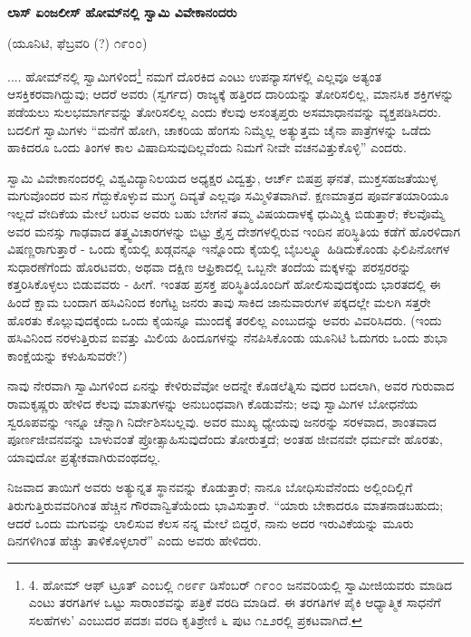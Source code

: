 \begin{center}
\textbf{ಲಾಸ್ ಏಂಜಲೀಸ್ ಹೋಮ್​ನಲ್ಲಿ ಸ್ವಾಮಿ ವಿವೇಕಾನಂದರು}
\end{center}

\begin{center}
(ಯೂನಿಟಿ, ಫೆಬ್ರವರಿ (?) ೧೯೦೦)
\end{center}

.... ಹೋಮ್​ನಲ್ಲಿ ಸ್ವಾಮಿಗಳಿಂದ\footnote{4. ಹೋಮ್​ ಆಫ್ ಟ್ರೂತ್ ಎಂಬಲ್ಲಿ ೧೮೯೯ ಡಿಸೆಂಬರ್ ೧೯೦೦ ಜನವರಿಯಲ್ಲಿ ಸ್ವಾಮೀಜಿಯವರು ಮಾಡಿದ ಎಂಟು ತರಗತಿಗಳ ಒಟ್ಟು ಸಾರಾಂಶವನ್ನು ಪತ್ರಿಕೆ ವರದಿ ಮಾಡಿದೆ. ಈ ತರಗತಿಗಳ ಪೈಕಿ ಆಧ್ಯಾತ್ಮಿಕ ಸಾಧನೆಗೆ ಸಲಹೆಗಳು’ ಎಂಬುದರ ಪದಶಃ ವರದಿ ಕೃತಿಶ್ರೇಣಿ ೬ ಪುಟ ೧೭೨ರಲ್ಲಿ ಪ್ರಕಟವಾಗಿದೆ.} ನಮಗೆ ದೊರಕಿದ ಎಂಟು ಉಪನ್ಯಾಸಗಳಲ್ಲಿ ಎಲ್ಲವೂ ಅತ್ಯಂತ ಆಸಕ್ತಿಕರವಾಗಿದ್ದುವು; ಆದರೆ ಅವರು (ಸ್ವರ್ಗದ) ರಾಜ್ಯಕ್ಕೆ ಹತ್ತಿರದ ದಾರಿಯನ್ನು ತೋರಿಸಲಿಲ್ಲ, ಮಾನಸಿಕ ಶಕ್ತಿಗಳನ್ನು ಪಡೆಯಲು ಸುಲಭಮಾರ್ಗವನ್ನು ತೋರಿಸಲಿಲ್ಲ ಎಂದು ಕೆಲವು ಅಸಂತೃಪ್ತರು ಅಸಮಾಧಾನವನ್ನು ವ್ಯಕ್ತಪಡಿಸಿದರು. ಬದಲಿಗೆ ಸ್ವಾಮಿಗಳು “ಮನೆಗೆ ಹೋಗಿ, ಚಾಕರಿಯ ಹೆಂಗಸು ನಿಮ್ಮೆಲ್ಲ ಅತ್ಯುತ್ತಮ ಚೈನಾ ಪಾತ್ರೆಗಳನ್ನು ಒಡೆದು ಹಾಕಿದರೂ ಒಂದು ತಿಂಗಳ ಕಾಲ ವಿಷಾದಿಸುವುದಿಲ್ಲವೆಂದು ನಿಮಗೆ ನೀವೇ ವಚನವಿತ್ತುಕೊಳ್ಳಿ” ಎಂದರು.

ಸ್ವಾಮಿ ವಿವೇಕಾನಂದರಲ್ಲಿ ವಿಶ್ವವಿದ್ಯಾನಿಲಯದ ಅಧ್ಯಕ್ಷರ ವಿದ್ವತ್ತು, ಆರ್ಚ್ ಬಿಷಪ್ರ ಘನತೆ, ಮುಕ್ತಸಹಜತೆಯುಳ್ಳ ಮಗುವೊಂದರ ಮನ ಗೆದ್ದುಕೊಳ್ಳುವ ಮುಗ್ಧ ದಿವ್ಯತೆ ಎಲ್ಲವೂ ಸಮ್ಮಿಳಿತವಾಗಿವೆ. ಕ್ಷಣಮಾತ್ರದ ಪೂರ್ವತಯಾರಿಯೂ ಇಲ್ಲದೆ ವೇದಿಕೆಯ ಮೇಲೆ ಬರುವ ಅವರು ಬಹು ಬೇಗನೆ ತಮ್ಮ ವಿಷಯದಾಳಕ್ಕೆ ಧುಮ್ಮಿಕ್ಕಿ ಬಿಡುತ್ತಾರೆ; ಕೆಲವೊಮ್ಮೆ ಅವರ ಮನಸ್ಸು ಗಾಢವಾದ ತತ್ತ್ವವಿಚಾರಗಳನ್ನು ಬಿಟ್ಟು ಕ್ರೈಸ್ತ ದೇಶಗಳಲ್ಲಿರುವ ಇಂದಿನ ಪರಿಸ್ಥಿತಿಯ ಕಡೆಗೆ ಹೊರಳಿದಾಗ ವಿಷಣ್ಣರಾಗುತ್ತಾರೆ - ಒಂದು ಕೈಯಲ್ಲಿ ಖಡ್ಗವನ್ನೂ ಇನ್ನೊಂದು ಕೈಯಲ್ಲಿ ಬೈಬಲ್ನ್ನೂ ಹಿಡಿದುಕೊಂಡು ಫಿಲಿಪಿನೋಗಳ ಸುಧಾರಣೆಗೆಂದು ಹೊರಟವರು, ಅಥವಾ ದಕ್ಷಿಣ ಆಫ್ರಿಕಾದಲ್ಲಿ ಒಬ್ಬನೇ ತಂದೆಯ ಮಕ್ಕಳನ್ನು ಪರಸ್ಪರರನ್ನು ಕತ್ತರಿಸಿಕೊಳ್ಳಲು ಬಿಡುವವರು - ಹೀಗೆ. ಇಂತಹ ಪ್ರಸಕ್ತ ಪರಿಸ್ಥಿತಿಯೊಂದಿಗೆ ಹೋಲಿಸುವುದಕ್ಕೆಂದು ಭಾರತದಲ್ಲಿ ಈ ಹಿಂದೆ ಕ್ಷಾಮ ಬಂದಾಗ ಹಸಿವಿನಿಂದ ಕಂಗೆಟ್ಟ ಜನರು ತಾವು ಸಾಕಿದ ಜಾನುವಾರುಗಳ ಪಕ್ಕದಲ್ಲೇ ಮಲಗಿ ಸತ್ತರೇ ಹೊರತು ಕೊಲ್ಲುವುದಕ್ಕೆಂದು ಒಂದು ಕೈಯನ್ನೂ ಮುಂದಕ್ಕೆ ತರಲಿಲ್ಲ ಎಂಬುದನ್ನು ಅವರು ವಿವರಿಸಿದರು. (ಇಂದು ಹಸಿವಿನಿಂದ ನರಳುತ್ತಿರುವ ಐವತ್ತು ಮಿಲಿಯ ಹಿಂದೂಗಳನ್ನು ನೆನಪಿಸಿಕೊಂಡು ಯೂನಿಟಿ ಓದುಗರು ಒಂದು ಶುಭಾ ಕಾಂಕ್ಷೆಯನ್ನು ಕಳುಹಿಸುವರೇ?)

ನಾವು ನೇರವಾಗಿ ಸ್ವಾಮಿಗಳಿಂದ ಏನನ್ನು ಕೇಳಿರುವೆವೋ ಅದನ್ನೇ ಕೊಡಲೆತ್ನಿಸು ವುದರ ಬದಲಾಗಿ, ಅವರ ಗುರುವಾದ ರಾಮಕೃಷ್ಣರು ಹೇಳಿದ ಕೆಲವು ಮಾತುಗಳನ್ನು ಅನುಬಂಧವಾಗಿ ಕೊಡುವೆನು; ಅವು ಸ್ವಾಮಿಗಳ ಬೋಧನೆಯ ಸ್ವರೂಪವನ್ನು ಇನ್ನೂ ಚೆನ್ನಾಗಿ ನಿರ್ದೇಶಿಸಬಲ್ಲವು. ಅವರ ಮುಖ್ಯ ಧ್ಯೇಯವು ಜನರನ್ನು ಸರಳವಾದ, ಶಾಂತವಾದ ಪೂರ್ಣಜೀವನವನ್ನು ಬಾಳುವಂತೆ ಪ್ರೋತ್ಸಾಹಿಸುವುದೆಂದು ತೋರುತ್ತದೆ; ಅಂತಹ ಜೀವನವೇ ಧರ್ಮವೇ ಹೊರತು, ಯಾವುದೋ ಪ್ರತ್ಯೇಕವಾಗಿರುವಂಥದಲ್ಲ.

ನಿಜವಾದ ತಾಯಿಗೆ ಅವರು ಅತ್ಯುನ್ನತ ಸ್ಥಾನವನ್ನು ಕೊಡುತ್ತಾರೆ; ನಾನೂ ಬೋಧಿಸುವೆನೆಂದು ಅಲ್ಲಿಂದಿಲ್ಲಿಗೆ ತಿರುಗುತ್ತಿರುವವರಿಗಿಂತ ಹೆಚ್ಚಿನ ಗೌರವಾನ್ವಿತೆಯೆಂದು ಭಾವಿಸುತ್ತಾರೆ. “ಯಾರು ಬೇಕಾದರೂ ಮಾತನಾಡಬಹುದು; ಆದರೆ ಒಂದು ಮಗುವನ್ನು ಲಾಲಿಸುವ ಕೆಲಸ ನನ್ನ ಮೇಲೆ ಬಿದ್ದರೆ, ನಾನು ಅದರ ಇರುವಿಕೆಯನ್ನು ಮೂರು ದಿನಗಳಿಗಿಂತ ಹೆಚ್ಚು ತಾಳಿಕೊಳ್ಳಲಾರೆ” ಎಂದು ಅವರು ಹೇಳಿದರು.

